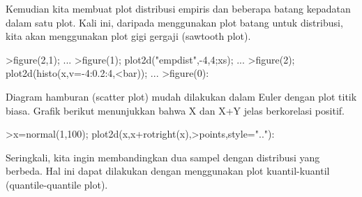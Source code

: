 \documentclass[12pt,arial,letterpaper]{book}
\begin{document}
\begin{eulercomment}
\begin{eulercomment}
\begin{eulercomment}
\begin{eulercomment}
\begin{eulercomment}
\begin{eulercomment}
\begin{eulercomment}
\begin{eulercomment}
\begin{eulercomment}
\begin{eulercomment}
\begin{eulercomment}
\begin{eulercomment}
\begin{eulercomment}
\begin{eulercomment}
\begin{eulercomment}
\begin{eulercomment}
\begin{eulercomment}
\begin{eulercomment}
\begin{eulercomment}
\begin{eulercomment}
\begin{eulercomment}
\begin{eulercomment}
\begin{eulercomment}
\begin{eulercomment}
\begin{eulercomment}
\begin{eulercomment}
\begin{eulercomment}
\begin{eulercomment}
\begin{eulercomment}
\begin{eulercomment}
\begin{eulercomment}
\begin{eulercomment}
\begin{eulercomment}
Kemudian kita membuat plot distribusi empiris dan beberapa batang
kepadatan dalam satu plot. Kali ini, daripada menggunakan plot batang
untuk distribusi, kita akan menggunakan plot gigi gergaji (sawtooth
plot).
\end{eulercomment}
\begin{eulerprompt}
>figure(2,1); ...
>figure(1); plot2d("empdist",-4,4;xs); ...
>figure(2); plot2d(histo(x,v=-4:0.2:4,<bar));  ...
>figure(0):
\end{eulerprompt}
\begin{eulercomment}
Diagram hamburan (scatter plot) mudah dilakukan dalam Euler dengan
plot titik biasa. Grafik berikut menunjukkan bahwa X dan X+Y jelas
berkorelasi positif.
\end{eulercomment}
\begin{eulerprompt}
>x=normal(1,100); plot2d(x,x+rotright(x),>points,style=".."):
\end{eulerprompt}
\begin{eulercomment}
Seringkali, kita ingin membandingkan dua sampel dengan distribusi yang
berbeda. Hal ini dapat dilakukan dengan menggunakan plot
kuantil-kuantil (quantile-quantile plot).


\end{eulercomment}
\end{eulercomment}
\end{eulercomment}
\end{eulercomment}
\end{eulercomment}
\end{eulercomment}
\end{eulercomment}
\end{eulercomment}
\end{eulercomment}
\end{eulercomment}
\end{eulercomment}
\end{eulercomment}
\end{eulercomment}
\end{eulercomment}
\end{eulercomment}
\end{eulercomment}
\end{eulercomment}
\end{eulercomment}
\end{eulercomment}
\end{eulercomment}
\end{eulercomment}
\end{eulercomment}
\end{eulercomment}
\end{eulercomment}
\end{eulercomment}
\end{eulercomment}
\end{eulercomment}
\end{eulercomment}
\end{eulercomment}
\end{eulercomment}
\end{eulercomment}
\end{eulercomment}
\end{eulercomment}
\end{document}
